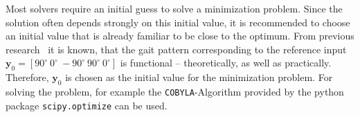 \documentclass[10pt,a4paper]{article}
\begin{document}
Most solvers require an initial guess to solve a minimization problem.
Since the solution often depends strongly on this initial value, it is recommended to choose an initial value that is already familiar to be close to the optimum.
From previous research~\cite{PA_Schiller} it is known, that the gait pattern corresponding to the reference input
$\bm{y}_0=[90^\circ ~ 0^\circ ~ -90^\circ ~ 90^\circ ~ 0^\circ]$
is functional -- theoretically, as well as practically.
Therefore, $\bm{y}_0$ is chosen as the initial value for the minimization problem.
For solving the problem, for example the \texttt{COBYLA}-Algorithm provided by the python package \texttt{scipy.optimize} can be used.

\end{document}
